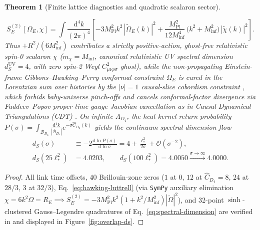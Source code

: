 \documentclass[11pt,a4paper]{article}
\newtheorem{theorem}{Theorem}[section]
\begin{document}
\begin{theorem}[Finite lattice diagnostics and quadratic scalaron sector]
\begin{enumerate}[label=(\roman*),leftmargin=1.9em,itemsep=2pt]
\begin{equation}
S_E^{(2)}[\Omega_E, \chi] = \int \frac{\mathrm{d}^4k}{(2\pi)^4}\left[
-3 M_{\mathrm{Pl}}^2 k^2\,|\tilde{\Omega}_E(k)|^2
+ \frac{M_{\mathrm{Pl}}^2}{12 M_{\mathrm{inf}}^4}\,\bigl(k^2 + M_{\mathrm{inf}}^2\bigr)\,|\tilde{\chi}(k)|^2
\right].
\label{eq:hawking-luttrell}
\end{equation}
Thus $+R^2/(6 M_{\mathrm{inf}}^2)$ contributes a strictly positive-action, ghost-free relativistic spin-0 scalaron $\chi$ ($m_\chi = M_{\mathrm{inf}}$, canonical relativistic UV spectral dimension $d_S^{\mathrm{UV}} = 4$, with zero spin-2 Weyl $C_{\mu\nu\rho\sigma}^2$ ghost), while the non-propagating Einstein-frame Gibbons--Hawking--Perry conformal constraint $\Omega_E$ is cured in the Lorentzian sum over histories by the $|\nu|=1$ causal-slice cobordism constraint \cite{Olcsak2026JMP}, which forbids baby-universe pinch-offs and cancels conformal-factor divergence via Faddeev--Popov proper-time gauge Jacobian cancellation as in Causal Dynamical Triangulations (CDT) \cite{DasguptaLoll2001,AmbjornJurkiewiczLoll2004}. On infinite $\Lambda_{D_4}$, the heat-kernel return probability $P(\sigma) = \int_{\mathcal{B}_{D_4}}\frac{\mathrm{d}^4k}{|\mathcal{B}_{D_4}|}e^{-\sigma\widehat{C}_{D_4}(k)}$ yields the continuum spectral dimension flow
\begin{equation}
\begin{aligned}
d_S(\sigma) &\equiv -2\frac{\mathrm{d}\ln P(\sigma)}{\mathrm{d}\ln\sigma} = 4 + \frac{\ell_*^2}{2\sigma} + \mathcal{O}(\sigma^{-2}), \\
d_S(25\ell_*^2) &= 4.0203, \qquad d_S(100\ell_*^2) = 4.0050 \xrightarrow{\sigma\to\infty} 4.0000.
\end{aligned}
\label{eq:spectral-dimension}
\end{equation}
\end{enumerate}
\end{theorem}

\begin{proof}
All link time offsets, $40$ Brillouin-zone zeros ($1$ at $0$, $12$ at $\widehat{C}_{D_4}=8$, $24$ at $28/3$, $3$ at $32/3$), Eq.~\eqref{eq:hawking-luttrell} (via \texttt{SymPy} auxiliary elimination $\chi = 6 k^2\Omega = R_E \implies S_E^{(2)} = -3 M_{\mathrm{Pl}}^2 k^2(1 + k^2/M_{\mathrm{inf}}^2)|\tilde{\Omega}|^2$), and 32-point $\sinh$-clustered Gauss--Legendre quadratures of Eq.~\eqref{eq:spectral-dimension} are verified in  and displayed in Figure~\ref{fig:overlap-ds}.
\end{proof}
\end{document}
